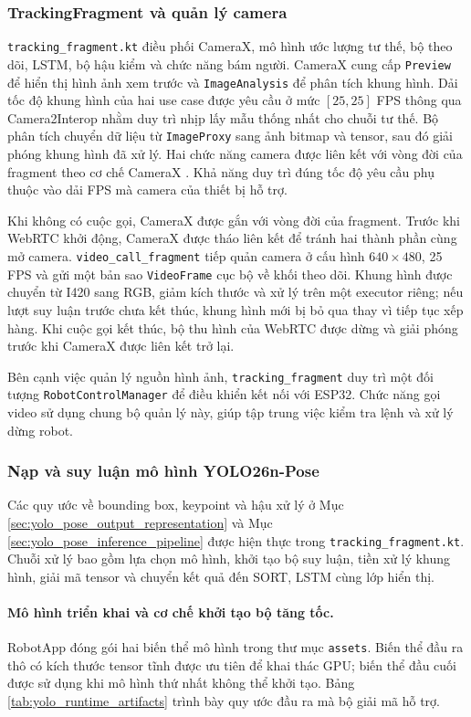 \subsubsection{TrackingFragment và quản lý camera}

\texttt{tracking\_fragment.kt} điều phối CameraX, mô hình ước lượng tư thế, bộ theo dõi, LSTM, bộ hậu kiểm và chức năng bám người. CameraX cung cấp \texttt{Preview} để hiển thị hình ảnh xem trước và \texttt{ImageAnalysis} để phân tích khung hình. Dải tốc độ khung hình của hai use case được yêu cầu ở mức $[25,25]$ FPS thông qua Camera2Interop nhằm duy trì nhịp lấy mẫu thống nhất cho chuỗi tư thế. Bộ phân tích chuyển dữ liệu từ \texttt{ImageProxy} sang ảnh bitmap và tensor, sau đó giải phóng khung hình đã xử lý. Hai chức năng camera được liên kết với vòng đời của fragment theo cơ chế CameraX . Khả năng duy trì đúng tốc độ yêu cầu phụ thuộc vào dải FPS mà camera của thiết bị hỗ trợ.

Khi không có cuộc gọi, CameraX được gắn với vòng đời của fragment. Trước khi WebRTC khởi động, CameraX được tháo liên kết để tránh hai thành phần cùng mở camera. \texttt{video\_call\_fragment} tiếp quản camera ở cấu hình $640\times480$, 25 FPS và gửi một bản sao \texttt{VideoFrame} cục bộ về khối theo dõi. Khung hình được chuyển từ I420 sang RGB, giảm kích thước và xử lý trên một executor riêng; nếu lượt suy luận trước chưa kết thúc, khung hình mới bị bỏ qua thay vì tiếp tục xếp hàng. Khi cuộc gọi kết thúc, bộ thu hình của WebRTC được dừng và giải phóng trước khi CameraX được liên kết trở lại.

Bên cạnh việc quản lý nguồn hình ảnh, \texttt{tracking\_fragment} duy trì một đối tượng \texttt{RobotControlManager} để điều khiển kết nối với ESP32. Chức năng gọi video sử dụng chung bộ quản lý này, giúp tập trung việc kiểm tra lệnh và xử lý dừng robot.

\subsubsection{Nạp và suy luận mô hình YOLO26n-Pose}

Các quy ước về bounding box, keypoint và hậu xử lý ở Mục \ref{sec:yolo_pose_output_representation} và Mục \ref{sec:yolo_pose_inference_pipeline} được hiện thực trong \texttt{tracking\_fragment.kt}. Chuỗi xử lý bao gồm lựa chọn mô hình, khởi tạo bộ suy luận, tiền xử lý khung hình, giải mã tensor và chuyển kết quả đến SORT, LSTM cùng lớp hiển thị.

\paragraph{Mô hình triển khai và cơ chế khởi tạo bộ tăng tốc.}
RobotApp đóng gói hai biến thể mô hình trong thư mục \texttt{assets}. Biến thể đầu ra thô có kích thước tensor tĩnh được ưu tiên để khai thác GPU; biến thể đầu cuối được sử dụng khi mô hình thứ nhất không thể khởi tạo. Bảng \ref{tab:yolo_runtime_artifacts} trình bày quy ước đầu ra mà bộ giải mã hỗ trợ.

